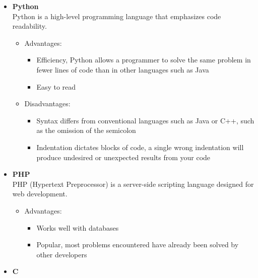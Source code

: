 \documentclass{article}
\begin{document}
\begin{itemize}
			\item\textbf{Python} \\
			Python is a high-level programming language that emphasizes code readability.
			
				\begin{itemize}
					\item Advantages:
						\begin{itemize}
							\item Efficiency, Python allows a programmer to solve the same problem in fewer lines of code than in other languages such as Java
							\item Easy to read
						\end{itemize}
						
					\item Disadvantages:
						\begin{itemize}
							\item Syntax differs from conventional languages such as Java or C++, such as the omission of the semicolon
							\item Indentation dictates blocks of code, a single wrong indentation will produce undesired or unexpected results from your code
						\end{itemize}
				\end{itemize}
				
			\item\textbf{PHP} \\
			PHP (Hypertext Preprocessor) is a server-side scripting language designed for web development.
				
				\begin{itemize}
					\item Advantages:
						\begin{itemize}
							\item Works well with databases
							\item Popular, most problems encountered have already been solved by other developers
						\end{itemize}
						
				\end{itemize}
				
			\item\textbf{C} \\
			

\end{itemize}
\end{document}

